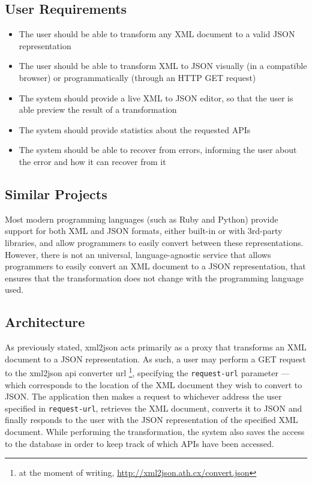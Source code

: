 \documentclass[twocolumn,twoside,10pt,a4paper]{article}
\begin{document}
\subsection{User Requirements}\label{sec:user-requirements}

\begin{itemize}
    \item The user should be able to transform any XML document to a valid JSON representation
    \item The user should be able to transform XML to JSON visually (in a compatible browser) or programmatically (through an HTTP GET request)
    \item The system should provide a live XML to JSON editor, so that the user is able preview the result of a transformation
    \item The system should provide statistics about the requested APIs
    \item The system should be able to recover from errors, informing the user about the error and how it can recover from it
\end{itemize}

\subsection{Similar Projects}\label{sec:similar-projects}

Most modern programming languages (such as Ruby and Python) provide support for both XML and JSON formats, either built-in or with 3rd-party libraries, and allow programmers to easily convert between these representations. However, there is not an universal, language-agnostic service that allows programmers to easily convert an XML document to a JSON representation, that ensures that the transformation does not change with the programming language used.

\subsection{Architecture}\label{sec:architecture}

As previously stated, xml2json acts primarily as a proxy that transforms an XML document to a JSON representation. As such, a user may perform a GET request to the xml2json api converter url \footnote{at the moment of writing, \url{http://xml2json.ath.cx/convert.json}}, specifying the \verb!request-url! parameter --- which corresponds to the location of the XML document they wish to convert to JSON. The application then makes a request to whichever address the user specified in \verb!request-url!, retrieves the XML document, converts it to JSON and finally responds to the user with the JSON representation of the specified XML document. While performing the transformation, the system also saves the access to the database in order to keep track of which APIs have been accessed.
\end{document}
